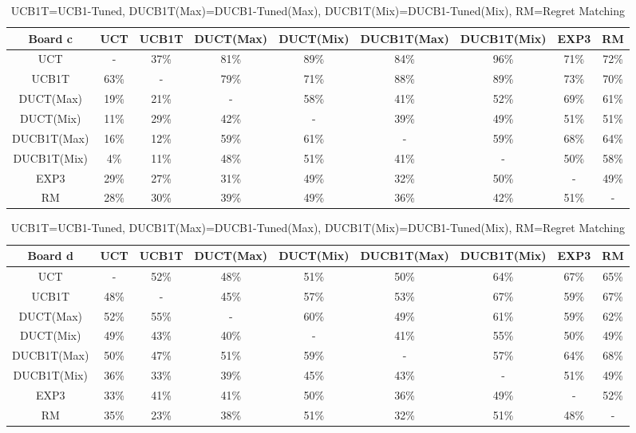 \documentclass{article}
\begin{document}
\begin{table}
\begin{tabular}{|c||c|c|c|c|c|c|c|c|}
									\hline
  Board c 		& UCT 	& UCB1T		& DUCT(Max)	& DUCT(Mix)	& DUCB1T(Max)	& DUCB1T(Mix)	& EXP3	& RM				\\ 	\hline\hline
  UCT 			&  -	& 37\% 		& 81\%		& 89\%		& 84\%		& 96\%		& 71\%	& 72\%				\\ 	\hline
  UCB1T 		& 63\% 	& - 		& 79\%		& 71\%		& 88\%		& 89\%		& 73\%	& 70\%				\\ 	\hline
  DUCT(Max) 		& 19\% 	& 21\% 		& -		& 58\%		& 41\%		& 52\%		& 69\%	& 61\%				\\ 	\hline
  DUCT(Mix) 		& 11\% 	& 29\% 		& 42\%		& -		& 39\%		& 49\%		& 51\%	& 51\%				\\ 	\hline
  DUCB1T(Max)	 	& 16\% 	& 12\% 		& 59\%		& 61\%		& -		& 59\%		& 68\%	& 64\%				\\ 	\hline
  DUCB1T(Mix)	 	& 4\%  	& 11\% 		& 48\%		& 51\%		& 41\%		& -		& 50\%	& 58\%				\\ 	\hline
  EXP3 			& 29\% 	& 27\% 		& 31\%		& 49\%		& 32\%		& 50\%		& -	& 49\%				\\ 	\hline
  RM 			& 28\% 	& 30\% 		& 39\%		& 49\%		& 36\%		& 42\%		& 51\%	& -				\\ 	\hline
\end{tabular}

\begin{tabular}{|c||c|c|c|c|c|c|c|c|}
									\hline
  Board d 		& UCT 	& UCB1T		& DUCT(Max)	& DUCT(Mix)	& DUCB1T(Max)	& DUCB1T(Mix)	& EXP3	& RM				\\ 	\hline\hline
  UCT 			&  -	& 52\%		& 48\%		& 51\%		& 50\%		& 64\%		& 67\%	& 65\%				\\ 	\hline
  UCB1T 		& 48\% 	& - 		& 45\%		& 57\%		& 53\%		& 67\%		& 59\%	& 67\%				\\ 	\hline
  DUCT(Max) 		& 52\% 	& 55\% 		& -		& 60\%		& 49\%		& 61\%		& 59\%	& 62\%				\\ 	\hline
  DUCT(Mix) 		& 49\% 	& 43\% 		& 40\%		& -		& 41\%		& 55\%		& 50\%	& 49\%				\\ 	\hline
  DUCB1T(Max)	 	& 50\% 	& 47\% 		& 51\%		& 59\%		& -		& 57\%		& 64\%	& 68\%				\\ 	\hline
  DUCB1T(Mix)	 	& 36\% 	& 33\% 		& 39\%		& 45\%		& 43\%		& -		& 51\%	& 49\%				\\ 	\hline
  EXP3 			& 33\% 	& 41\% 		& 41\%		& 50\%		& 36\%		& 49\%		& -	& 52\%				\\ 	\hline
  RM 			& 35\% 	& 23\% 		& 38\%		& 51\%		& 32\%		& 51\%		& 48\%	& -				\\ 	\hline
\end{tabular}
\caption*{UCB1T=UCB1-Tuned, DUCB1T(Max)=DUCB1-Tuned(Max), DUCB1T(Mix)=DUCB1-Tuned(Mix), RM=Regret Matching}
\label{table:round_robin}
\end{table}
\end{document}
